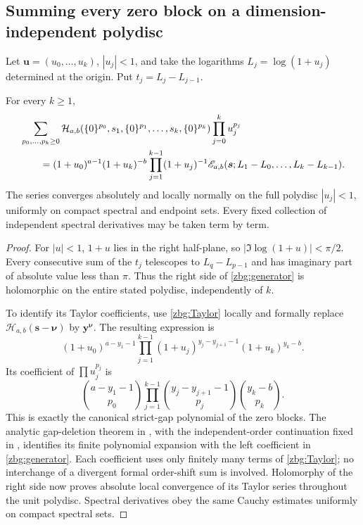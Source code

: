 \subsection{Summing every zero block on a dimension-independent polydisc}

Let $\boldsymbol u=(u_0,\ldots,u_k)$, $|u_j|<1$, and take the
logarithms $L_j=\log(1+u_j)$ determined at the origin.  Put
$t_j=L_j-L_{j-1}$.

\begin{theorem}
\label{zbg:main}
For every $k\geq1$,
\begin{align}\label{zbg:generator}
 &\sum_{p_0,\ldots,p_k\geq0}
 \mathcal H_{a,b}(\{0\}^{p_0},s_1,\{0\}^{p_1},\ldots,
                       s_k,\{0\}^{p_k})\prod_{j=0}^ku_j^{p_j}
 \notag\\
 &\qquad=(1+u_0)^{a-1}(1+u_k)^{-b}
                    \prod_{j=1}^{k-1}(1+u_j)^{-1}
        \mathscr E_{a,b}(\boldsymbol s;
                L_1-L_0,\ldots,L_k-L_{k-1}).
\end{align}
The series converges absolutely and locally normally on the full
polydisc $|u_j|<1$, uniformly on compact spectral and endpoint sets.
Every fixed collection of independent spectral derivatives may be
taken term by term.
\end{theorem}

\begin{proof}
For $|u|<1$, $1+u$ lies in the right half-plane, so
$|\Im\log(1+u)|<\pi/2$.  Every consecutive sum of the $t_j$
telescopes to $L_q-L_{p-1}$ and has imaginary part of absolute value
less than $\pi$.  Thus the right side of \eqref{zbg:generator}
is holomorphic on the entire stated polydisc, independently of $k$.

To identify its Taylor coefficients, use \eqref{zbg:Taylor} locally
and formally replace
$\mathcal H_{a,b}(\boldsymbol s-\boldsymbol\nu)$ by
$\boldsymbol y^{\boldsymbol\nu}$.  The resulting expression is
\[
 (1+u_0)^{a-y_1-1}
 \prod_{j=1}^{k-1}(1+u_j)^{y_j-y_{j+1}-1}
 (1+u_k)^{y_k-b}.
\]
Its coefficient of $\prod u_j^{p_j}$ is
\[
 \binom{a-y_1-1}{p_0}
 \prod_{j=1}^{k-1}\binom{y_j-y_{j+1}-1}{p_j}
 \binom{y_k-b}{p_k}.
\]
This is exactly the canonical strict-gap polynomial of the zero
blocks.  The analytic gap-deletion theorem in \cite{IncomingParity},
with the independent-order continuation fixed in \cite{IncomingIndependent},
identifies its finite polynomial expansion with
the left coefficient in \eqref{zbg:generator}.  Each coefficient
uses only finitely many terms of \eqref{zbg:Taylor}; no interchange
of a divergent formal order-shift sum is involved.  Holomorphy of the
right side now proves absolute local convergence of its Taylor series
throughout the unit polydisc.  Spectral derivatives obey the same
Cauchy estimates uniformly on compact spectral sets.
\end{proof}


